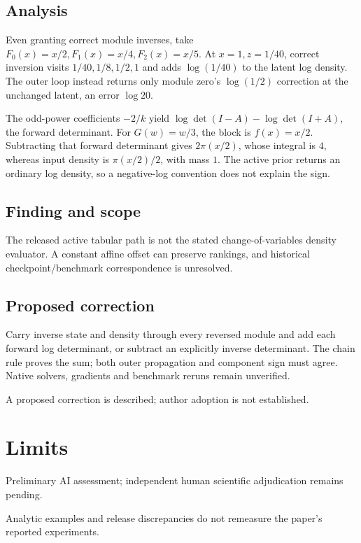 \documentclass[11pt]{article}
\begin{document}
\subsection*{Analysis}

Even granting correct module inverses, take \(F_0(x)=x/2,F_1(x)=x/4,F_2(x)=x/5\). At \(x=1,z=1/40\), correct inversion visits \(1/40,1/8,1/2,1\) and adds \(\log(1/40)\) to the latent log density. The outer loop instead returns only module zero’s \(\log(1/2)\) correction at the unchanged latent, an error \(\log20\).

The odd-power coefficients \(-2/k\) yield \(\log\det(I-A)-\log\det(I+A)\), the forward determinant. For \(G(w)=w/3\), the block is \(f(x)=x/2\). Subtracting that forward determinant gives \(2\pi(x/2)\), whose integral is \(4\), whereas input density is \(\pi(x/2)/2\), with mass \(1\). The active prior returns an ordinary log density, so a negative-log convention does not explain the sign.

\subsection*{Finding and scope}

The released active tabular path is not the stated change-of-variables density evaluator. A constant affine offset can preserve rankings, and historical checkpoint/benchmark correspondence is unresolved.

\subsection*{Proposed correction}

Carry inverse state and density through every reversed module and add each forward log determinant, or subtract an explicitly inverse determinant. The chain rule proves the sum; both outer propagation and component sign must agree. Native solvers, gradients and benchmark reruns remain unverified.

A proposed correction is described; author adoption is not established.

\section*{Limits}

Preliminary AI assessment; independent human scientific adjudication remains pending.\par

Analytic examples and release discrepancies do not remeasure the paper’s reported experiments.\par
\end{document}
